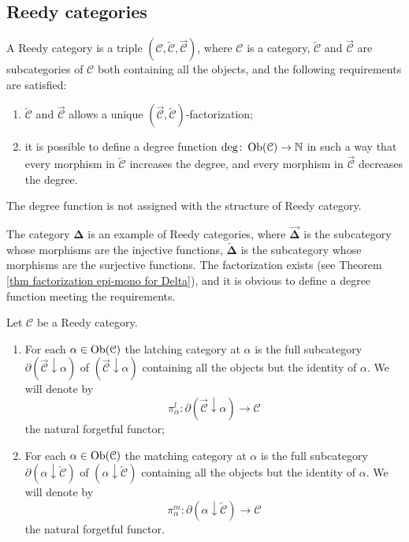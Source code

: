\begin{refsection}
\subsection{Reedy categories}

\begin{defin}
A Reedy category is a triple $\left(\mathcal C, \overleftarrow{\mathcal C}, \overrightarrow{\mathcal C}\right)$, where $\mathcal C$ is a category, $\overleftarrow{\mathcal C}$ and $\overrightarrow{\mathcal C}$ are subcategories of $\mathcal C$ both containing all the objects, and the following requirements are satisfied:
\begin{enumerate}
\item $\overleftarrow{\mathcal C}$ and $\overrightarrow{\mathcal C}$ allows a unique $\left(\overrightarrow{\mathcal C}, \overleftarrow{\mathcal C}\right)$-factorization;
\item it is possible to define a degree function $\deg \colon \operatorname{Ob}(\mathcal C) \to \mathbb{N}$ in such a way that every morphism in $\overleftarrow{\mathcal C}$ increases the degree, and every morphism in $\overrightarrow{\mathcal C}$ decreases the degree.
\end{enumerate}
\end{defin}

\begin{rmk}
The degree function is not assigned with the structure of Reedy category.
\end{rmk}

\begin{eg}
The category $\boldsymbol\Delta$ is an example of Reedy categories, where $\overrightarrow{\boldsymbol\Delta}$ is the subcategory whose morphisms are the injective functions, $\overleftarrow{\boldsymbol\Delta}$ is the subcategory whose morphisms are the surjective functions. The factorization exists (see Theorem \ref{thm factorization epi-mono for Delta}), and it is obvious to define a degree function meeting the requirements.
\end{eg}

\begin{defin}
Let $\mathcal C$ be a Reedy category.
\begin{enumerate}
\item For each $\alpha \in \operatorname{Ob}(\mathcal C)$ the latching category at $\alpha$ is the full subcategory $\partial ( \overrightarrow{\mathcal C} \downarrow \alpha )$ of $( \overrightarrow{\mathcal C} \downarrow \alpha )$ containing all the objects but the identity of $\alpha$. We will denote by
\[
\pi_\alpha^l \colon \partial (\overrightarrow{\mathcal C} \downarrow \alpha ) \to \mathcal C
\]
the natural forgetful functor;
\item For each $\alpha \in \operatorname{Ob}(\mathcal C)$ the matching category at $\alpha$ is the full subcategory $\partial ( \alpha \downarrow \overleftarrow{\mathcal C} )$ of $( \alpha \downarrow \overleftarrow{\mathcal C} )$ containing all the objects but the identity of $\alpha$. We will denote by
\[
\pi_\alpha^m \colon \partial ( \alpha \downarrow \overleftarrow{\mathcal C} ) \to \mathcal C
\]
the natural forgetful functor.
\end{enumerate}
\end{defin}


\end{refsection}
